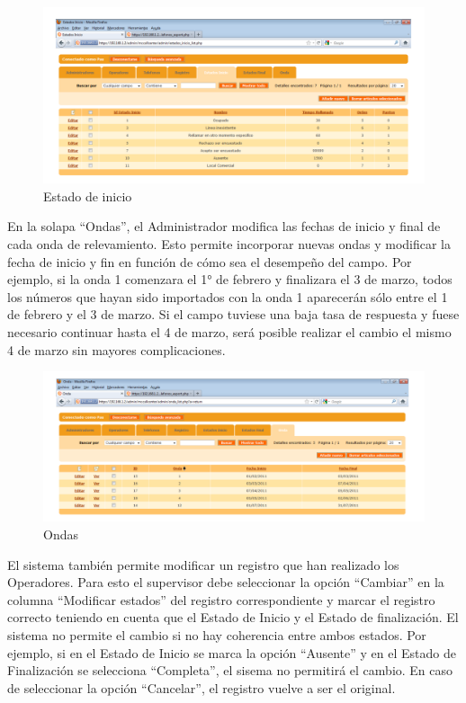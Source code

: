 \documentclass[
  openany]{book}
\begin{document}
\begin{figure}

{\centering \includegraphics[width=1\linewidth]{imagenes/figura6-07} 

}

\caption{Estado de inicio}\label{fig:Estado}
\end{figure}

En la solapa ``Ondas'', el Administrador modifica las fechas de inicio y final de cada onda de relevamiento. Esto permite incorporar nuevas ondas y modificar la fecha de inicio y fin en función de cómo sea el desempeño del campo. Por ejemplo, si la onda 1 comenzara el 1° de febrero y finalizara el 3 de marzo, todos los números que hayan sido importados con la onda 1 aparecerán sólo entre el 1 de febrero y el 3 de marzo. Si el campo tuviese una baja tasa de respuesta y fuese necesario continuar hasta el 4 de marzo, será posible realizar el cambio el mismo 4 de marzo sin mayores complicaciones.

\begin{figure}

{\centering \includegraphics[width=1\linewidth]{imagenes/figura6-08} 

}

\caption{Ondas}\label{fig:Ond}
\end{figure}

El sistema también permite modificar un registro que han realizado los Operadores. Para esto el supervisor debe seleccionar la opción ``Cambiar'' en la columna ``Modificar estados'' del registro correspondiente y marcar el registro correcto teniendo en cuenta que el Estado de Inicio y el Estado de finalización. El sistema no permite el cambio si no hay coherencia entre ambos estados. Por ejemplo, si en el Estado de Inicio se marca la opción ``Ausente'' y en el Estado de Finalización se selecciona ``Completa'', el sisema no permitirá el cambio. En caso de seleccionar la opción ``Cancelar'', el registro vuelve a ser el original.
\end{document}
